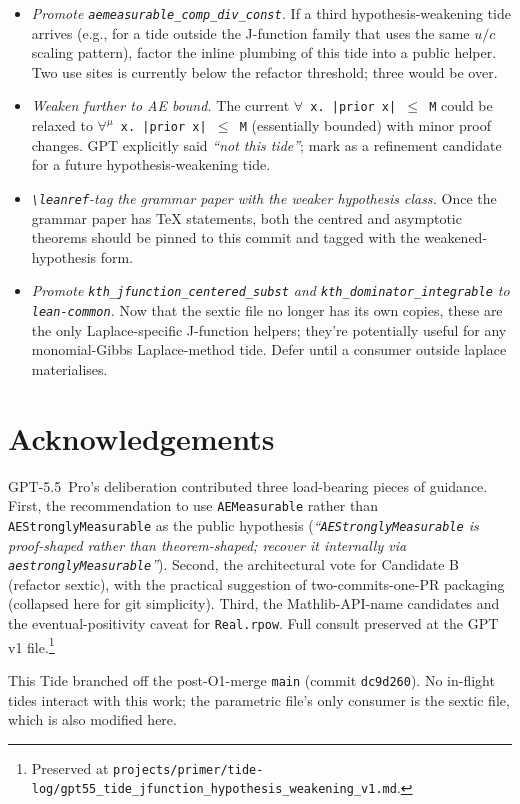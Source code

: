 \documentclass[11pt]{article}
\begin{document}
\begin{itemize}
\item \emph{Promote \texttt{aemeasurable\_comp\_div\_const}.} If a
  third hypothesis-weakening tide arrives (e.g., for a tide outside
  the J-function family that uses the same $u/c$ scaling pattern),
  factor the inline plumbing of this tide into a public helper. Two
  use sites is currently below the refactor threshold; three would
  be over.
\item \emph{Weaken further to AE bound.} The current
  \texttt{$\forall$ x.~|prior x| $\le$ M} could be relaxed to
  \texttt{$\forall^\mu$ x.~|prior x| $\le$ M} (essentially bounded)
  with minor proof changes. GPT explicitly said \emph{``not this
  tide''}; mark as a refinement candidate for a future
  hypothesis-weakening tide.
\item \emph{\texttt{\textbackslash leanref}-tag the grammar paper
  with the weaker hypothesis class.} Once the grammar paper has TeX
  statements, both the centred and asymptotic theorems should be
  pinned to this commit and tagged with the weakened-hypothesis
  form.
\item \emph{Promote \texttt{kth\_jfunction\_centered\_subst} and
  \texttt{kth\_dominator\_integrable} to \texttt{lean-common}.}
  Now that the sextic file no longer has its own copies, these are
  the only Laplace-specific J-function helpers; they're potentially
  useful for any monomial-Gibbs Laplace-method tide. Defer until a
  consumer outside laplace materialises.
\end{itemize}

\section*{Acknowledgements}

GPT-5.5~Pro's deliberation contributed three load-bearing pieces of
guidance. First, the recommendation to use \texttt{AEMeasurable}
rather than \texttt{AEStronglyMeasurable} as the public hypothesis
(\emph{``\texttt{AEStronglyMeasurable} is proof-shaped rather than
theorem-shaped; recover it internally via
\texttt{aestronglyMeasurable}''}). Second, the architectural vote for
Candidate B (refactor sextic), with the practical suggestion of
two-commits-one-PR packaging (collapsed here for git simplicity).
Third, the Mathlib-API-name candidates and the eventual-positivity
caveat for \texttt{Real.rpow}. Full consult preserved at the GPT v1
file.\footnote{Preserved at
\texttt{projects/primer/tide-log/gpt55\_tide\_jfunction\_hypothesis\_weakening\_v1.md}.}

This Tide branched off the post-O1-merge \texttt{main} (commit
\texttt{dc9d260}). No in-flight tides interact with this work; the
parametric file's only consumer is the sextic file, which is also
modified here.
\end{document}
